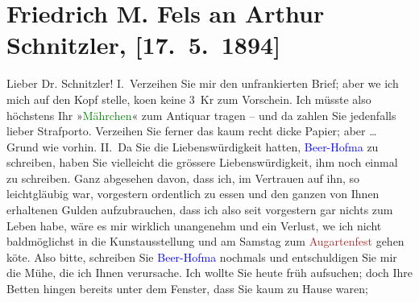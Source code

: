 

               \section[Friedrich M. Fels an Arthur Schnitzler, {[}17. 5. 1894{]}]{ Friedrich M. Fels an Arthur Schnitzler, {[}17. 5. 1894{]}}\nopagebreak{}\rehead{ }\normalsize\beginnumbering{} \toendnotes[C]{\smallbreak\pagebreak[2]} 
\toendnotes[C]{\smallbreak}\pstart{}{\pb}Lieber Dr. Schnitzler!\pend\pstart
           I. Verzeihen Sie mir den unfrankierten Brief; aber we{\geminationn} ich mich auf den Kopf stelle, ko{\geminationm}en keine 3 Kr
                    zum Vorschein. Ich müsste also höchstens Ihr »\textcolor{green}{Mährchen}{}\ledrightnote{\textcolor{green}{Das Märchen. Schauspiel in drei Aufzügen}}« zum Antiquar tragen – und da zahlen Sie jedenfalls lieber
                    Strafporto. Verzeihen Sie ferner das kaum recht dicke Papier; aber {\dots} Grund wie vorhin.\pend
           \pstart
           II. Da Sie die Liebenswürdigkeit hatten, \textcolor{blue}{Beer-Hofma{\geminationn}}{}\ledrightnote{\textcolor{blue}{Richard Beer-Hofmann}} zu schreiben, haben Sie vielleicht die grössere Liebenswürdigkeit, ihm
                    noch einmal zu schreiben. Ganz abgesehen davon, dass ich, im Vertrauen auf ihn,
                    so leichtgläubig war, vorgestern ordentlich zu essen und den ganzen von Ihnen
                    erhaltenen Gulden aufzubrauchen, dass ich also seit vorgestern gar nichts zum
                    Leben habe, wäre es mir wirklich unangenehm und ein Verlust, we{\geminationn} ich nicht baldmöglichst in die Kunstausstellung
                    und am Samstag zum \textcolor{brown}{Augartenfest}{}\ledrightnote{\textcolor{brown}{Augartenfest}}
                    gehen kö{\geminationn}te. Also bitte, schreiben Sie \textcolor{blue}{Beer-Hofma{\geminationn}}{}\ledrightnote{\textcolor{blue}{Richard Beer-Hofmann}} nochmals und entschuldigen Sie mir die Mühe, die ich Ihnen verursache. Ich
                    wollte Sie heute früh aufsuchen; doch Ihre Betten hingen bereits {\pb}unter dem Fenster, dass Sie kaum zu Hause waren;
